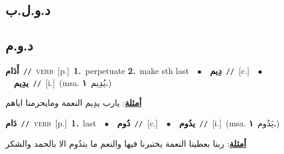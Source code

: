 \documentclass[10pt,a4paper,twoside]{article} %
\begin{document}
\begin{multicols}{2}
\vspace{-3mm}
\subsection*{\color{blue}\foreignlanguage{arabic}{د.و.ل.ب}\color{blue}{}} 

\vspace{-3mm}
\subsection*{\color{blue}\foreignlanguage{arabic}{د.و.م}\color{blue}{}} 

{\setlength\topsep{0pt}\textbf{\foreignlanguage{arabic}{أَدَام}}\ {\color{gray}\texttt{//}\color{black}}\ \textsc{verb}\ [p.]\ \textbf{1.}~perpetuate  \textbf{2.}~make sth last\ \ $\bullet$\ \ \setlength\topsep{0pt}\textbf{\foreignlanguage{arabic}{دِيم}}\ {\color{gray}\texttt{//}\color{black}}\ [c.]\ \ $\bullet$\ \ \setlength\topsep{0pt}\textbf{\foreignlanguage{arabic}{يدِيم}}\ {\color{gray}\texttt{//}\color{black}}\ [i.]\ \color{gray}(msa. \foreignlanguage{arabic}{يُدِيم}~\foreignlanguage{arabic}{\textbf{١.}})\color{black}\  \begin{flushright}\color{gray}\foreignlanguage{arabic}{\textbf{\underline{\foreignlanguage{arabic}{أمثلة}}}: يارب يدِيم النعمة ومايحرمنا اياهم}\end{flushright}\color{black}} \vspace{2mm}

{\setlength\topsep{0pt}\textbf{\foreignlanguage{arabic}{دَام}}\ {\color{gray}\texttt{//}\color{black}}\ \textsc{verb}\ [p.]\ \textbf{1.}~last\ \ $\bullet$\ \ \setlength\topsep{0pt}\textbf{\foreignlanguage{arabic}{دُوم}}\ {\color{gray}\texttt{//}\color{black}}\ [c.]\ \ $\bullet$\ \ \setlength\topsep{0pt}\textbf{\foreignlanguage{arabic}{يدُوم}}\ {\color{gray}\texttt{//}\color{black}}\ [i.]\ \color{gray}(msa. \foreignlanguage{arabic}{يَدُوم}~\foreignlanguage{arabic}{\textbf{١.}})\color{black}\  \begin{flushright}\color{gray}\foreignlanguage{arabic}{\textbf{\underline{\foreignlanguage{arabic}{أمثلة}}}: ربنا بعطينا النعمة يختبرنا فيها والنعم ما بتدُوم الا بالحمد والشكر}\end{flushright}\color{black}} \vspace{2mm}


\end{multicols}
\end{document}
